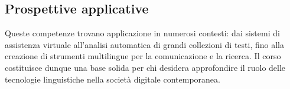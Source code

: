     \subsection{Prospettive applicative}
    Queste competenze trovano applicazione in numerosi contesti: dai sistemi di assistenza virtuale
    all'analisi automatica di grandi collezioni di testi, fino alla creazione di strumenti multilingue
    per la comunicazione e la ricerca.  
    Il corso costituisce dunque una base solida per chi desidera approfondire il ruolo delle tecnologie linguistiche nella società digitale contemporanea.



    